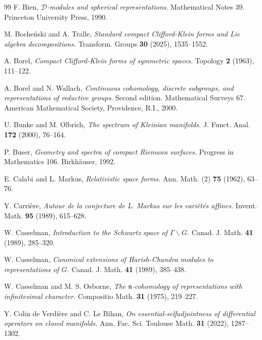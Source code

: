 \documentclass[10]{amsart}
\theoremstyle{remark}
\theoremstyle{definition}
\numberwithin{equation}{section}
\newcommand{\fn}{{\mathfrak n}}
\newcommand{\Cal}{\mathcal}
\begin{document}
{\begin{thebibliography}{99}
 F. Bien, {\em ${\Cal D}$-modules and spherical representations}. 
Mathematical Notes 39. Princeton University Press, 1990.

M. Boche\' nski and A. Tralle, {\it Standard compact Clifford-Klein forms and Lie algebra decompositions.} Transform. Groups {\bf 30} (2025), 1535--1552. 

 A. Borel, {\it Compact Clifford-Klein forms of symmetric spaces.} Topology {\bf 2} (1963), 111--122. 

 A. Borel and N. Wallach, {\em Continuous cohomology, discrete subgroups, and representations of reductive groups}. 
Second edition. Mathematical Surveys 67. American Mathematical Society, Providence, R.I., 2000.

 U. Bunke and M. Olbrich, {\it The spectrum of Kleinian manifolds.}
J. Funct. Anal. {\bf 172} (2000), 76--164.

 P. Buser, {\em Geometry and spectra of compact Riemann surfaces.}
Progress in Mathematics 106. Birkh\"auser, 1992.





 E. Calabi and L. Markus, {\em Relativistic space forms.} Ann. Math. (2) {\bf 75} (1962), 63--76.

 Y. Carri\`ere, {\em Autour de la conjecture de L. Markus sur les vari\'et\'es affines.} Invent. Math. {\bf 95} (1989), 615--628.

 W. Casselman, {\it Introduction to the Schwartz space of $\Gamma\backslash G$.} Canad. J. Math. {\bf 41} (1989), 285--320.

 W. Casselman, {\it Canonical extensions of {H}arish-{C}handra modules to representations of {$G$}.} Canad. J. Math. {\bf 41} (1989), 385--438.

 W. Casselman and M. S. Osborne, {\it The $\fn$-cohomology of representations with infinitesimal character.} Compositio Math. {\bf 31} (1975), 219--227.

 Y. Colin de Verdi\`ere and C. Le Bihan, {\it On essential-selfadjointness of differential operators on closed manifolds.}  Ann. Fac. Sci. Toulouse Math. {\bf 31} (2022), 1287--1302.


\end{thebibliography}}
\end{document}
